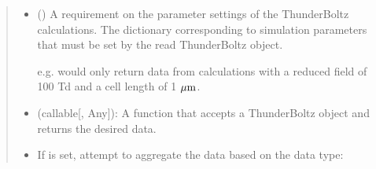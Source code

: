 \documentclass[letterpaper,10pt,english,openany,oneside]{sphinxmanual}
\begin{document}
\begin{fulllineitems}
\begin{quote}
\begin{description}
\begin{itemize}
\item {} 
\sphinxAtStartPar
{} () \textendash{} 
\sphinxAtStartPar
A requirement on the
parameter settings of the ThunderBoltz calculations.
The dictionary corresponding to simulation parameters
that must be set by the read ThunderBoltz object.

\sphinxAtStartPar
e.g.  would only
return data from calculations with a reduced field of
100 Td and a cell length of 1 \(\mu{\rm m}\).


\item {} 
\sphinxAtStartPar
{} \textendash{} (callable{[}{\hyperref[\detokenize{api/pytb.ThunderBoltz:pytb.ThunderBoltz}]{}}, Any{]}):
A function that accepts a ThunderBoltz object and
returns the desired data.

\item {} 
\sphinxAtStartPar
{} \textendash{} 
\sphinxAtStartPar
If  is set, attempt to aggregate the data
based on the data type:



\end{itemize}
\end{description}
\end{quote}
\end{fulllineitems}
\end{document}
